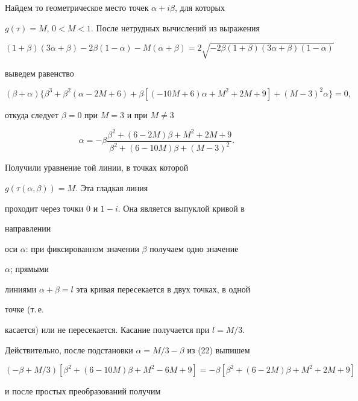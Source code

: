 Найдем то геометрическое место точек $\alpha+i\beta$, для которых


$g(\tau)=M$, $0<M<1$. После нетрудных вычислений из выражения


$$


(1+\beta)(3\alpha+\beta)-2\beta(1-\alpha)-M(\alpha+\beta)=


2\sqrt{-2\beta(1+\beta)(3\alpha+\beta)(1-\alpha)}


$$


выведем равенство


$$


(\beta+\alpha)\{\beta^3+\beta^2(\alpha-2M+6)+\beta


[(-10M+6)\alpha+M^2+2M+9]+(M-3)^2\alpha\}=0,


$$


откуда следует $\beta=0$ при $M=3$ и при $M\ne 3$


\begin{equation}


\alpha=-\beta\frac{\beta^2+(6-2M)\beta+M^2+2M+9}


{\beta^2+(6-10M)\beta+(M-3)^2}.


\end{equation}





Получили уравнение той линии, в точках которой


$g(\tau(\alpha,\beta))=M$. Эта гладкая линия


проходит через точки 0 и $1-i$. Она является выпуклой кривой в


направлении


оси $\alpha$: при фиксированном значении $\beta$ получаем одно значение


$\alpha$; прямыми


линиями $\alpha+\beta=l$ эта кривая пересекается в двух точках, в одной


точке (т.\,е.


касается) или не пересекается. Касание получается при $l=M/3$.


Действительно, после подстановки $\alpha=M/3-\beta$ из (22) выпишем


$$


(-\beta+M/3)[\beta^2+(6-10M)\beta+M^2-6M+9]=


-\beta[\beta^2+(6-2M)\beta+M^2+2M+9]


$$


и после простых преобразований получим


$$


